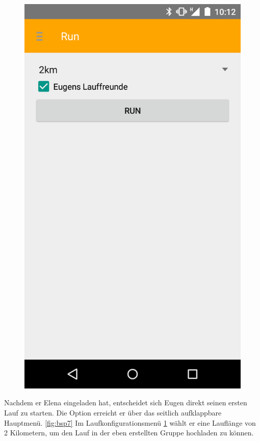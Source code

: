 \begin{figure}
\begin{minipage}{.4\textwidth}
  \includegraphics[width=.8\linewidth]{abb/bsp/bsp8}
  \label{fig:bsp8}
\end{minipage}
\end{figure}

Nachdem er Elena eingeladen hat, entscheidet sich Eugen direkt seinen ersten Lauf zu starten. Die Option erreicht er über das seitlich aufklappbare Hauptmenü. \ref{fig:bsp7} Im Laufkonfigurationsmenü \ref{fig:bsp8} wählt er eine Lauflänge von  2 Kilometern, um den Lauf in der eben erstellten Gruppe hochladen zu können.


